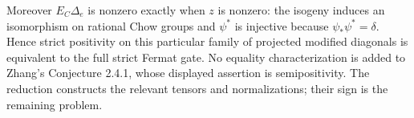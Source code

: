 Moreover $E_C\Delta_e$ is nonzero exactly when $z$ is nonzero:
the isogeny induces an isomorphism on rational Chow groups and
$\psi^*$ is injective because $\psi_*\psi^*=\delta$.  Hence strict
positivity on this particular family of projected modified
diagonals is equivalent to the full strict Fermat gate.  No
equality characterization is added to Zhang's Conjecture 2.4.1,
whose displayed assertion is semipositivity.  The reduction
constructs the relevant tensors and normalizations; their sign is
the remaining problem.
